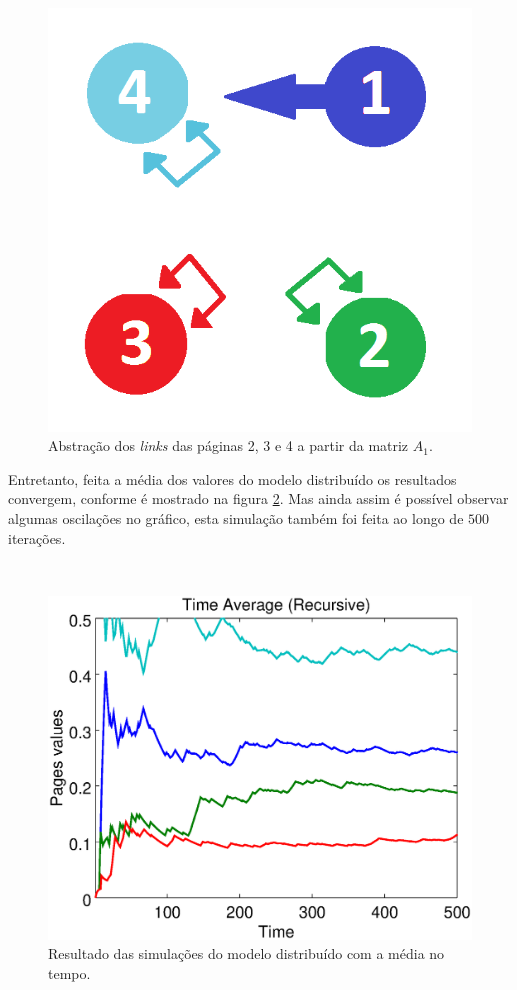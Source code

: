 \documentclass[a4paper]{report} %
\begin{document}
\
\begin{figure}[!htb]
	\centering
	\includegraphics[scale=0.3]{imagens/loop}
	\caption{Abstração dos \textit{links} das páginas 2, 3 e 4 a partir da matriz $A_1$.}
	\label{loop}
\end{figure}

Entretanto, feita a média dos valores do modelo distribuído os resultados convergem, conforme é mostrado na figura \ref{timerecursive}. Mas ainda assim é possível observar algumas oscilações no gráfico, esta simulação também foi feita ao longo de $500$ iterações.

\
\begin{figure}[!htb]
	\centering
	\includegraphics[scale=0.3]{imagens/timerecursive}
	\caption{Resultado das simulações do modelo distribuído com a média no tempo.}
	\label{timerecursive}
\end{figure}
\end{document}
